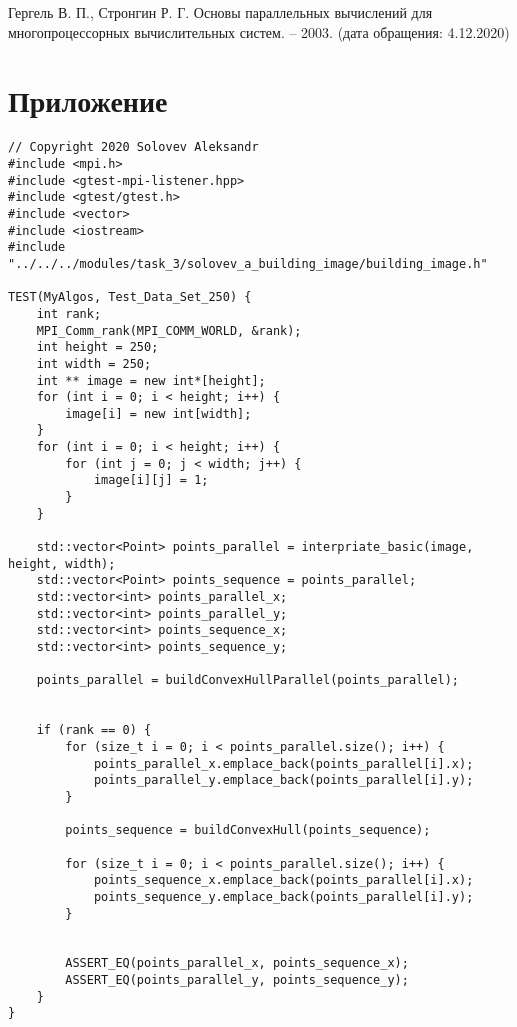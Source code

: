 \documentclass{report}
\begin{document}
\begin{thebibliography}{1}
 Гергель В. П., Стронгин Р. Г. Основы параллельных вычислений для многопроцессорных вычислительных систем. – 2003. (дата обращения: 4.12.2020)
\end{thebibliography}
\newpage

\section*{Приложение}
\begin{lstlisting}
// Copyright 2020 Solovev Aleksandr
#include <mpi.h>
#include <gtest-mpi-listener.hpp>
#include <gtest/gtest.h>
#include <vector>
#include <iostream>
#include "../../../modules/task_3/solovev_a_building_image/building_image.h"

TEST(MyAlgos, Test_Data_Set_250) {
    int rank;
    MPI_Comm_rank(MPI_COMM_WORLD, &rank);
    int height = 250;
    int width = 250;
    int ** image = new int*[height];
    for (int i = 0; i < height; i++) {
        image[i] = new int[width];
    }
    for (int i = 0; i < height; i++) {
        for (int j = 0; j < width; j++) {
            image[i][j] = 1;
        }
    }

    std::vector<Point> points_parallel = interpriate_basic(image, height, width);
    std::vector<Point> points_sequence = points_parallel;
    std::vector<int> points_parallel_x;
    std::vector<int> points_parallel_y;
    std::vector<int> points_sequence_x;
    std::vector<int> points_sequence_y;

    points_parallel = buildConvexHullParallel(points_parallel);


    if (rank == 0) {
        for (size_t i = 0; i < points_parallel.size(); i++) {
            points_parallel_x.emplace_back(points_parallel[i].x);
            points_parallel_y.emplace_back(points_parallel[i].y);
        }

        points_sequence = buildConvexHull(points_sequence);

        for (size_t i = 0; i < points_parallel.size(); i++) {
            points_sequence_x.emplace_back(points_parallel[i].x);
            points_sequence_y.emplace_back(points_parallel[i].y);
        }


        ASSERT_EQ(points_parallel_x, points_sequence_x);
        ASSERT_EQ(points_parallel_y, points_sequence_y);
    }
}


\end{lstlisting}
\end{document}

